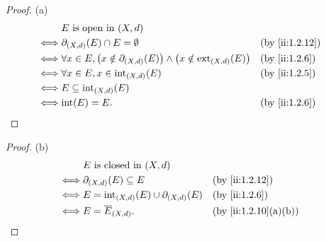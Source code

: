 \begin{proof}{(a)}
  \begin{align*}
         & E \text{ is open in } (X, d)                                                                                                 \\
    \iff & \partial_{(X, d)}(E) \cap E = \emptyset                                                                  &  & \by{ii:1.2.12} \\
    \iff & \forall x \in E, \big(x \notin \partial_{(X, d)}(E)\big) \land \big(x \notin \text{ext}_{(X, d)}(E)\big) &  & \by{ii:1.2.6}  \\
    \iff & \forall x \in E, x \in \text{int}_{(X, d)}(E)                                                            &  & \by{ii:1.2.5}  \\
    \iff & E \subseteq \text{int}_{(X, d)}(E)                                                                                           \\
    \iff & \text{int}(E) = E.                                                                                       &  & \by{ii:1.2.6}
  \end{align*}
\end{proof}

\begin{proof}{(b)}
  \begin{align*}
         & E \text{ is closed in } (X, d)                                                \\
    \iff & \partial_{(X, d)}(E) \subseteq E                     &  & \by{ii:1.2.12}      \\
    \iff & E = \text{int}_{(X, d)}(E) \cup \partial_{(X, d)}(E) &  & \by{ii:1.2.6}       \\
    \iff & E = \overline{E}_{(X, d)}.                           &  & \by{ii:1.2.10}[a,b]
  \end{align*}
\end{proof}


